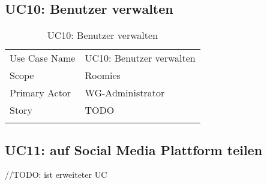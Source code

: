 \subsection{UC10: Benutzer verwalten}
\begin{table}[H]
	\tablestyle
	\tablealtcolored
	\begin{tabularx}{\textwidth}{lX}
		\tablebody
			Use Case Name &
			UC10: Benutzer verwalten
			\tabularnewline
			Scope &
			Roomies
			\tabularnewline
			Primary Actor &
			WG-Administrator
			\tabularnewline
			Story &
			TODO
			\tabularnewline
		\tableend
	\end{tabularx}
	\caption{UC10: Benutzer verwalten}
\end{table}


\subsection{UC11: auf Social Media Plattform teilen}

//TODO: ist erweiteter UC
